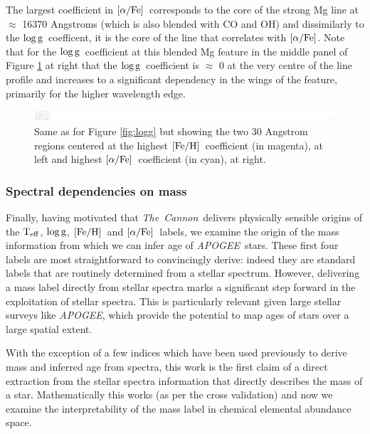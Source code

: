 \documentclass[12pt, preprint]{aastex}
\newcommand{\project}[1]{\textsl{#1}}
\newcommand{\tc}{\project{The~Cannon}}
\newcommand{\apogee}{\project{APOGEE}}
\newcommand{\teff}{\mbox{$\rm T_{eff}$}}
\newcommand{\feh}{\mbox{$\rm [Fe/H]$}}
\newcommand{\alphafe}{\mbox{$\rm [\alpha/Fe]$}}
\newcommand{\logg}{\mbox{$\rm \log g$}}
\begin{document}
The largest coefficient in \alphafe\ corresponds to the core of the strong Mg line at $\approx$ 16370 Angstroms (which is also blended with CO and OH) and dissimilarly to the \logg\ coefficent, it is the core of the line that correlates with \alphafe. Note that for the \logg\ coefficient at this blended Mg feature in the middle panel of Figure \ref{fig:feha} at right that the \logg\ coefficient is $\approx$ 0 at the very centre of the line profile and increases to a significant dependency in the wings of the feature, primarily for the higher wavelength edge. 


\begin{figure}[h!]
\centering
    \includegraphics[scale=0.51]{./plots/coeffs_af_3.png}
  \caption{Same as for Figure \ref{fig:logg} but showing the two 30 Angstrom regions centered at the highest \feh\ coefficient (in magenta), at left and highest \alphafe\ coefficient (in cyan), at right.}
\label{fig:feha}
\end{figure}



\subsubsection{Spectral dependencies on mass} 

Finally, having motivated that \tc\ delivers physically sensible origins of the \teff, \logg, \feh\ and \alphafe\ labels, we examine the origin of the mass information from which we can infer age of \apogee\ stars. 
These first four labels are most straightforward  to convincingly derive: indeed they are standard labels that are routinely determined from a stellar spectrum. However, delivering a mass label directly from stellar spectra marks a significant step forward in the exploitation of stellar spectra. This is particularly relevant given large stellar surveys like \apogee, which provide the potential to map ages of stars over a large spatial extent. 

With the exception of a few indices which have been used previously to derive mass and inferred age from spectra, this work is the first claim of a direct extraction from the stellar spectra information that directly describes the mass of a star.  Mathematically this works (as per the cross validation) and now we examine the interpretability of the mass label in chemical elemental abundance space. 
\end{document}
